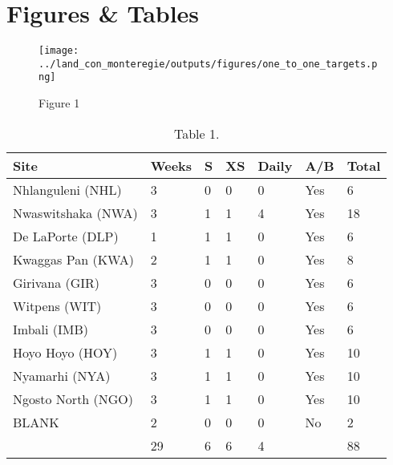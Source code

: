 \section*{Figures \& Tables}

\begin{figure}[!ht]
  \centering
    \texttt{[image: ../land\_con\_monteregie/outputs/figures/one\_to\_one\_targets.png]}
  \caption{Figure 1}
  \label{fig:map}
\end{figure}

\begin{table}[h!]
\centering
\begin{tabular}{llllll|l}
  \hline
  \hline
  Site & Weeks & S & XS & Daily & A/B & Total\\
  \hline
  Nhlanguleni (NHL) 	& 3 & 0 & 0 & 0 & Yes & 6 \\
  Nwaswitshaka (NWA) 	& 3 & 1 & 1 & 4 & Yes & 18 \\
  De LaPorte (DLP) 		& 1 & 1 & 1 & 0 & Yes & 6 \\
  Kwaggas Pan (KWA) 	& 2 & 1 & 1 & 0 & Yes & 8\\
  Girivana (GIR) 		& 3 & 0 & 0 & 0 & Yes & 6 \\
  Witpens (WIT) 		& 3 & 0 & 0 & 0 & Yes & 6 \\
  Imbali (IMB) 			& 3 & 0 & 0 & 0 & Yes & 6 \\
  Hoyo Hoyo (HOY) 		& 3 & 1 & 1 & 0 & Yes & 10 \\
  Nyamarhi (NYA) 		& 3 & 1 & 1 & 0 & Yes & 10 \\
  Ngosto North (NGO) 	& 3 & 1 & 1 & 0 & Yes &10 \\
  BLANK 				& 2 & 0 & 0 & 0 & No & 2 \\
  \hline
   						& 29 & 6 & 6 & 4 & & 88 \\
  \hline
  \hline
\end{tabular}
\caption{Table 1.}
\label{tab:samples}
\end{table}
